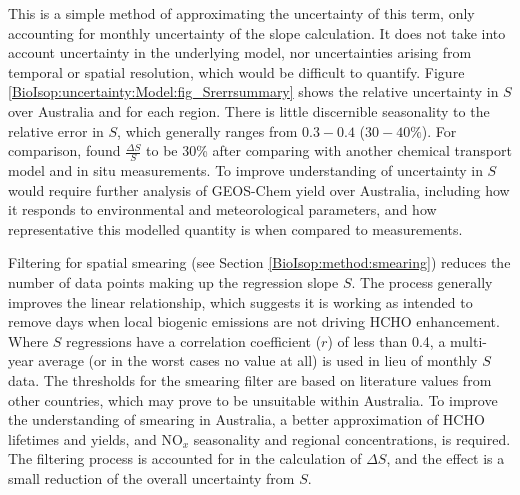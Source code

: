     
    This is a simple method of approximating the uncertainty of this term, only accounting for monthly uncertainty of the slope calculation.
    It does not take into account uncertainty in the underlying model, nor uncertainties arising from temporal or spatial resolution, which would be difficult to quantify.
    Figure \ref{BioIsop:uncertainty:Model:fig_Srerrsummary} shows the relative uncertainty in $S$ over Australia and for each region.
    There is little discernible seasonality to the relative error in $S$, which generally ranges from $0.3-0.4$ ($30-40\%$).
    For comparison, \textcite{Palmer2006} found $\frac{\Delta S}{S}$ to be 30\% after comparing with another chemical transport model and in situ measurements.
    To improve understanding of uncertainty in $S$ would require further analysis of GEOS-Chem yield over Australia, including how it responds to environmental and meteorological parameters, and how representative this modelled quantity is when compared to measurements.
    
    
    Filtering for spatial smearing (see Section \ref{BioIsop:method:smearing}) reduces the number of data points making up the regression slope $S$. 
    The process generally improves the linear relationship, which suggests it is working as intended to remove days when local biogenic emissions are not driving HCHO enhancement.
    Where $S$ regressions have a correlation coefficient ($r$) of less than 0.4, a multi-year average (or in the worst cases no value at all) is used in lieu of monthly $S$ data.
    The thresholds for the smearing filter are based on literature values from other countries, which may prove to be unsuitable within Australia.
    To improve the understanding of smearing in Australia, a better approximation of HCHO lifetimes and yields, and NO$_x$ seasonality and regional concentrations, is required.
    The filtering process is accounted for in the calculation of $\Delta S$, and the effect is a small reduction of the overall uncertainty from $S$.
    
    
